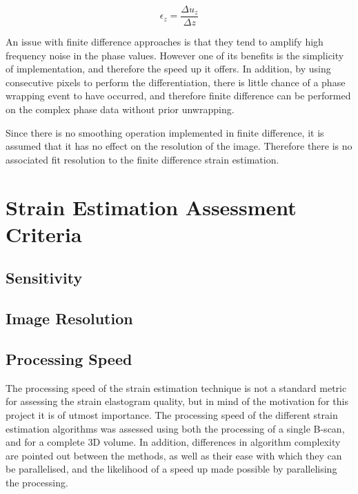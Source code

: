 \begin{equation}
	\label{fd_strain}
	\epsilon_z = \frac{\Delta u_z}{\Delta z}
\end{equation}

An issue with finite difference approaches is that they tend to amplify high frequency noise in the phase values. However one of its benefits is the simplicity of implementation, and therefore the speed up it offers. In addition, by using consecutive pixels to perform the differentiation, there is little chance of a phase wrapping event to have occurred, and therefore finite difference can be performed on the complex phase data without prior unwrapping.

Since there is no smoothing operation implemented in finite difference, it is assumed that it has no effect on the resolution of the image. Therefore there is no associated fit resolution to the finite difference strain estimation.

\section{Strain Estimation Assessment Criteria}

\subsection{Sensitivity}

\subsection{Image Resolution}

\subsection{Processing Speed}
The processing speed of the strain estimation technique is not a standard metric for assessing the strain elastogram quality, but in mind of the motivation for this project it is of utmost importance.
The processing speed of the different strain estimation algorithms was assessed using both the processing of a single B-scan, and for a complete 3D volume. In addition, differences in algorithm complexity are pointed out between the methods, as well as their ease with which they can be parallelised, and the likelihood of a speed up made possible by parallelising the processing.

